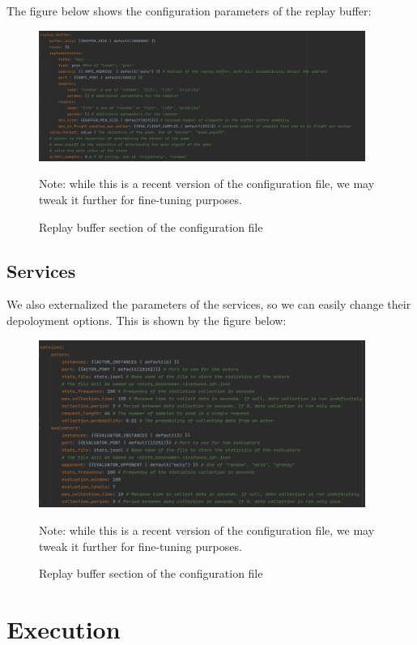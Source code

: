 The figure below shows the configuration parameters of the replay buffer:
\begin{figure}[ht]
	\centering
	\includegraphics[width=0.95\textwidth]{Figures/ReplayBufferConfiguration.png}
	\caption{Replay buffer section of the configuration file \label{fig:ReplayBufferConfiguration.png}}
	\small{Note: while this is a recent version of the configuration file, we may tweak it further for fine-tuning purposes.}
\end{figure}
\FloatBarrier
%
\subsection{Services}
We also externalized the parameters of the services, so we can easily change their depoloyment options. This is shown by the figure below:
\begin{figure}[ht]
	\centering
	\includegraphics[width=0.95\textwidth]{Figures/ServicesConfiguration.png}
	\caption{Replay buffer section of the configuration file \label{fig:ServicesConfiguration.png}}
	\small{Note: while this is a recent version of the configuration file, we may tweak it further for fine-tuning purposes.}
\end{figure}
\FloatBarrier
\section{Execution}